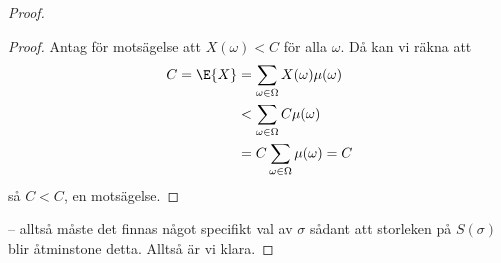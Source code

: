 \documentclass[nobib]{tufte-handout}
\begin{document}
\begin{theorem}
\begin{proof}
{\begin{lemma}
                \begin{proof}
                    Antag för motsägelse att $X(\omega) < C$ för alla $\omega$. Då kan vi räkna att
                    \begin{align*}
                        C = \E{X} &= \sum_{\omega \in \Omega} X(\omega)\mu(\omega)\\
                        &< \sum_{\omega \in \Omega} C\mu(\omega)\\
                        &= C\sum_{\omega \in \Omega} \mu(\omega) = C
                    \end{align*}
                    så $C < C$, en motsägelse.
                \end{proof}
            \end{lemma}
        } -- alltså måste det finnas något specifikt val av $\sigma$ sådant att storleken på $S(\sigma)$ blir åtminstone detta. Alltså är vi klara.
    \end{proof}
\end{theorem}
\end{document}
